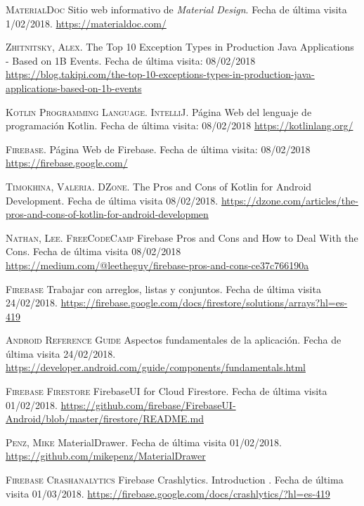 \documentclass[twoside]{report}
\begin{document}
\begin{thebibliography}{a}
 \textsc{MaterialDoc} 
Sitio web informativo de \textit{Material Design}. Fecha de última visita 1/02/2018. \url{https://materialdoc.com/}



 \textsc{Zhitnitsky, Alex}. The Top 10 Exception Types in Production Java Applications - Based on 1B Events. Fecha de última visita: 08/02/2018 \url{https://blog.takipi.com/the-top-10-exceptions-types-in-production-java-applications-based-on-1b-events}

 \textsc{Kotlin Programming Language. IntelliJ}. Página Web del lenguaje de programación Kotlin. Fecha de última visita: 08/02/2018 \url{https://kotlinlang.org/}

 \textsc{Firebase}. Página Web de Firebase. Fecha de última visita: 08/02/2018 \url{https://firebase.google.com/}

 \textsc{Timokhina, Valeria. DZone}. The Pros and Cons of Kotlin for Android Development. Fecha de última visita 08/02/2018. \url{https://dzone.com/articles/the-pros-and-cons-of-kotlin-for-android-developmen}

 \textsc{Nathan, Lee. FreeCodeCamp} Firebase Pros and Cons and How to Deal With the Cons. Fecha de última visita 08/02/2018 \url{https://medium.com/@leetheguy/firebase-pros-and-cons-ce37c766190a}

 \textsc{Firebase} Trabajar con arreglos, listas y conjuntos. Fecha de última visita 24/02/2018.  \url{https://firebase.google.com/docs/firestore/solutions/arrays?hl=es-419}

 \textsc{Android Reference Guide} Aspectos fundamentales de la aplicación. Fecha de última visita 24/02/2018. \url{https://developer.android.com/guide/components/fundamentals.html}

 \textsc{Firebase Firestore} FirebaseUI for Cloud Firestore. Fecha de última visita 01/02/2018. \url{https://github.com/firebase/FirebaseUI-Android/blob/master/firestore/README.md}

 \textsc{Penz, Mike} MaterialDrawer. Fecha de última visita 01/02/2018. \url{https://github.com/mikepenz/MaterialDrawer}

 \textsc{Firebase Crashanalytics} 
Firebase Crashlytics. Introduction . Fecha de última visita 01/03/2018. \url{https://firebase.google.com/docs/crashlytics/?hl=es-419}


\end{thebibliography}
\end{document}
